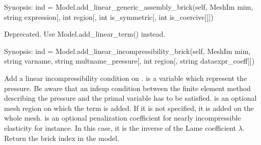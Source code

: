 \documentclass[a4paper,11pt,english]{sphinxmanual}
\begin{document}
\begin{fulllineitems}

\begin{fulllineitems}
\label{\detokenize{python/cmdref_Model:getfem.Model.add_linear_generic_assembly_brick}}
Synopsis: ind = Model.add\_linear\_generic\_assembly\_brick(self, MeshIm mim, string expression{[}, int region{[}, int is\_symmetric{[}, int is\_coercive{]}{]}{]})

Deprecated. Use Model.add\_linear\_term() instead.

\end{fulllineitems}


\begin{fulllineitems}
\label{\detokenize{python/cmdref_Model:getfem.Model.add_linear_incompressibility_brick}}
Synopsis: ind = Model.add\_linear\_incompressibility\_brick(self, MeshIm mim, string varname, string multname\_pressure{[}, int region{[}, string dataexpr\_coeff{]}{]})

Add a linear incompressibility condition on . 
is a variable which represent the pressure. Be aware that an inf\sphinxhyphen{}sup
condition between the finite element method describing the pressure and the
primal variable has to be satisfied.  is an optional mesh region on
which the term is added. If it is not specified, it is added on the whole
mesh.  is an optional penalization coefficient for nearly
incompressible elasticity for instance. In this case, it is the inverse
of the Lame coefficient \(\lambda\). Return the brick index in the
model.

\end{fulllineitems}


\end{fulllineitems}
\end{document}
